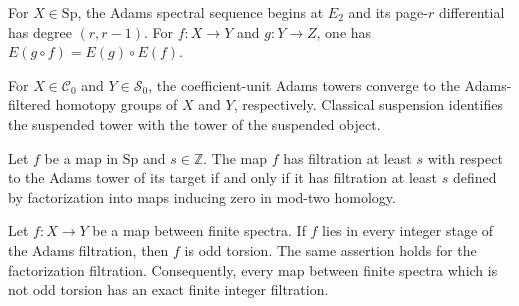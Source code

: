 \begin{theorem}
\label{sem:AdamsSynthetic:synthetic-indices}
For $X\in\mathrm{Sp}$, the Adams spectral sequence begins at $E_2$ and its page-$r$ differential has degree $(r,r-1)$. For $f\colon X\to Y$ and $g\colon Y\to Z$, one has $E(g\circ f)=E(g)\circ E(f)$.
\end{theorem}

\begin{definition}
\label{sem:AdamsSynthetic:selected-convergence}
For $X\in\mathcal C_0$ and $Y\in\mathcal S_0$, the coefficient-unit Adams towers converge to the Adams-filtered homotopy groups of $X$ and $Y$, respectively. Classical suspension identifies the suspended tower with the tower of the suspended object.
\end{definition}

\begin{theorem}
\label{sem:AdamsSynthetic:filtration-comparison}
Let $f$ be a map in $\mathrm{Sp}$ and $s\in\mathbb Z$. The map $f$ has filtration at least $s$ with respect to the Adams tower of its target if and only if it has filtration at least $s$ defined by factorization into maps inducing zero in mod-two homology.
\end{theorem}

\begin{theorem}
\label{sem:AdamsSynthetic:finite-separation}
Let $f\colon X\to Y$ be a map between finite spectra. If $f$ lies in every integer stage of the Adams filtration, then $f$ is odd torsion. The same assertion holds for the factorization filtration. Consequently, every map between finite spectra which is not odd torsion has an exact finite integer filtration.
\end{theorem}

